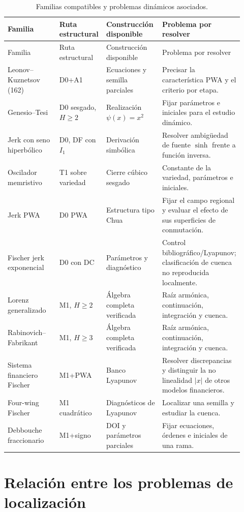 \begin{longtable}{@{}L{0.23\linewidth}L{0.20\linewidth}L{0.24\linewidth}L{0.25\linewidth}@{}}
\caption{Familias compatibles y problemas dinámicos asociados.}
\label{tab:candidate-portfolio}\\
\toprule
Familia & Ruta estructural & Construcción disponible & Problema por resolver\\
\midrule
\endfirsthead
\toprule
Familia & Ruta estructural & Construcción disponible & Problema por resolver\\
\midrule
\endhead
Leonov--Kuznetsov (162) & D0+A1 & Ecuaciones y semilla parciales &
Precisar la característica PWA y el criterio por etapa.\\
Genesio--Tesi & D0 sesgado, \(H\ge2\) & Realización
\(\psi(x)=x^2\) & Fijar parámetros e iniciales para el estudio dinámico.\\
Jerk con seno hiperbólico & D0, DF con \(I_1\) & Derivación simbólica &
Resolver ambigüedad de fuente \(\sinh\) frente a función inversa.\\
Oscilador memristivo & T1 sobre variedad & Cierre cúbico sesgado &
Constante de la variedad, parámetros e iniciales.\\
Jerk PWA & D0 PWA & Estructura tipo Chua & Fijar el campo regional y evaluar
el efecto de sus superficies de conmutación.\\
Fischer jerk exponencial & D0 con DC & Parámetros y diagnóstico &
Control bibliográfico/Lyapunov; clasificación de cuenca no reproducida
localmente.\\
Lorenz generalizado & M1, \(H\ge2\) & Álgebra completa verificada &
Raíz armónica, continuación, integración y cuenca.\\
Rabinovich--Fabrikant & M1, \(H\ge3\) & Álgebra completa verificada &
Raíz armónica, continuación, integración y cuenca.\\
Sistema financiero Fischer & M1+PWA & Banco Lyapunov & Resolver discrepancias
y distinguir la no linealidad \(|x|\) de otros modelos financieros.\\
Four-wing Fischer & M1 cuadrático & Diagnósticos de Lyapunov & Localizar una
semilla y estudiar la cuenca.\\
Debbouche fraccionario & M1+signo & DOI y parámetros parciales
\cite{debbouche2021} & Fijar ecuaciones, órdenes e iniciales de una rama.\\
\bottomrule
\end{longtable}

\section{Relación entre los problemas de localización}
\label{sec:candidate-order}


